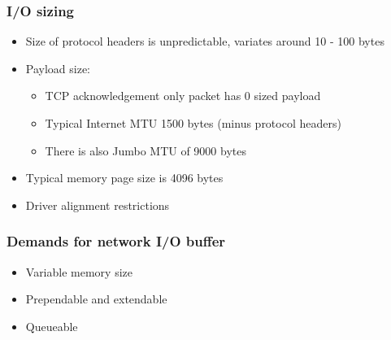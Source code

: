 \documentclass{beamer}
\begin{document}
\begin{frame}
\frametitle{I/O sizing}
  \begin{itemize}
    \item {Size of protocol headers is unpredictable,
	 variates around 10 - 100 bytes}
    \item {Payload size:
	\begin{itemize}
	  \item{TCP acknowledgement only packet has 0 sized payload}
	  \item{Typical Internet MTU 1500 bytes (minus protocol headers)}
	  \item{There is also Jumbo MTU of 9000 bytes}
	\end{itemize}
    }
    \item {Typical memory page size is 4096 bytes}
    \item {Driver alignment restrictions}
  \end{itemize}
\end{frame}


\begin{frame}
\frametitle{Demands for network I/O buffer}
\begin{itemize}
  \item{Variable memory size}
  \item{Prependable and extendable}
  \item{Queueable}
\end{itemize}
\end{frame}
\end{document}
